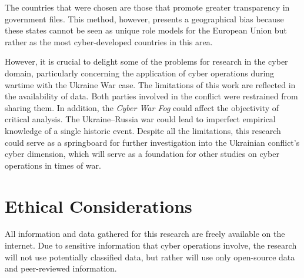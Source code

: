 The countries that were chosen are those that promote greater transparency in government files. This method, however, presents a geographical bias because these states cannot be seen as unique role models for the European Union but rather as the most cyber-developed countries in this area.

However, it is crucial to delight some of the problems for research in the cyber domain, particularly concerning the application of cyber operations during wartime with the Ukraine War case. The limitations of this work are reflected in the availability of data. Both parties involved in the conflict were restrained from sharing them. In addition, the \textit{Cyber War Fog} could affect the objectivity of critical analysis. The Ukraine–Russia war could lead to imperfect empirical knowledge of a single historic event.  Despite all the limitations, this research could serve as a springboard for further investigation into the Ukrainian conflict's cyber dimension, which will serve as a foundation for other studies on cyber operations in times of war.

\section{Ethical Considerations}

All information and data gathered for this research are freely available on the internet. Due to sensitive information that cyber operations involve, the research will not use potentially classified data, but rather will use only open-source data and peer-reviewed information. 




